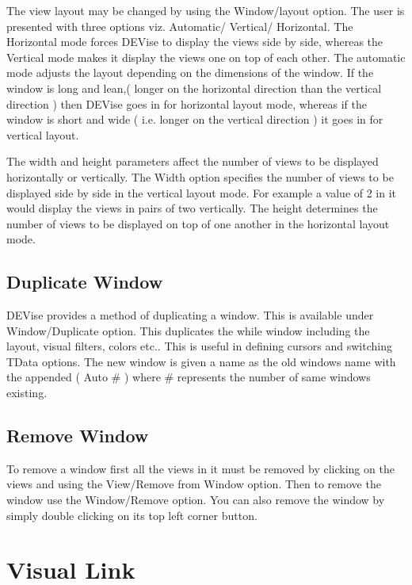 The view layout may be changed by using the Window/layout option. The user is presented with three options viz. Automatic/ Vertical/ Horizontal. The Horizontal mode forces DEVise to display the views side by side, whereas the Vertical mode makes it display the views one on top of each other. The automatic mode adjusts the layout depending on the dimensions of the window. If the window is long and lean,( longer on the horizontal direction than the vertical direction ) then DEVise goes in for horizontal layout mode, whereas if the window is short and wide ( i.e. longer on the vertical direction ) it goes in for vertical layout. 

The width and height parameters affect the number of views to be displayed horizontally or vertically. The Width option specifies the number of views to be displayed side by side in the vertical layout mode. For example a value of 2 in it would display the views in pairs of two vertically. The height determines the number of views to be displayed on top of one another in the horizontal layout mode.

\subsection{Duplicate Window}

DEVise provides a method of duplicating a window. This is available under Window/Duplicate option. This duplicates the while window including the layout, visual filters, colors etc.. This is useful in defining cursors and switching TData options. The new window is given a name as the old windows name with the appended ( Auto \# ) where \# represents the number of  same windows existing.


\subsection{Remove Window}

To remove a window first all the views in it must be removed by clicking on the views and using the View/Remove from Window option. Then to remove the window use the Window/Remove option. You can also remove the window by simply double clicking on its top left corner button.


\section{Visual Link}

